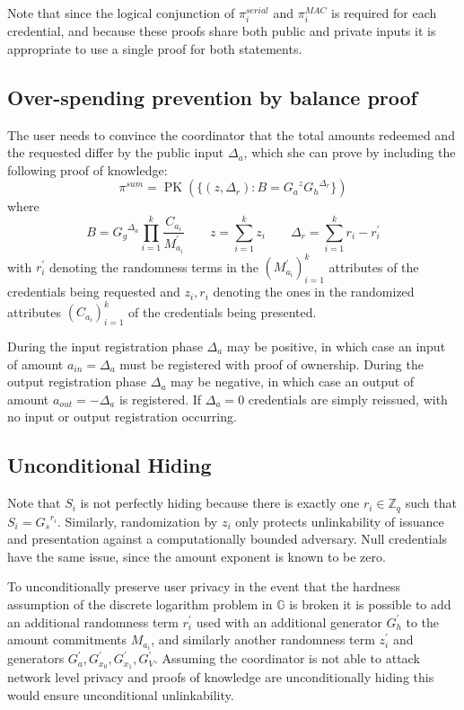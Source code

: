 \documentclass[a4paper]{article}
\begin{document}
Note that since the logical conjunction of $\pi_i^{\mathit{serial}}$ and $\pi_i^{\mathit{MAC}}$ is required for each credential, and because these proofs share both public and private inputs it is appropriate to use a single proof for both statements.

\subsection{Over-spending prevention by balance proof}\label{balance}

The user needs to convince the coordinator that the total amounts redeemed and the requested differ by the public input $\Delta_{a}$, which she can prove by including the following proof of knowledge:
\[ \pi^{\mathit{sum}} = \operatorname{PK}(\{ (z, \Delta_r) : B = {G_a}^{z} {G_h}^{\Delta_r} \})
\]
where
\[
B = {G_g}^{\Delta_a} \prod_{i=1}^k \frac{C_{a_i}}{M^{\prime}_{a_i}}
\qquad
z = \sum_{i=1}^k z_i
\qquad
\Delta_r = \sum_{i=1}^k r_i - r^{\prime}_i
\]
with $r^{\prime}_i$ denoting the randomness terms in the $(M^{\prime}_{a_i})_{i=1}^k$ attributes of the credentials being requested and $z_i, r_i$ denoting the ones in the randomized attributes $(C_{a_i})_{i=1}^k$ of the credentials being presented.

During the input registration phase $\Delta_{a}$ may be positive, in which case an input of amount $a_{\mathit{in}} = \Delta_{a}$ must be registered with proof of ownership. During the output registration phase $\Delta_{a}$ may be negative, in which case an output of amount $a_{\mathit{out}} = -\Delta_{a}$ is registered. If $\Delta_{a} = 0$ credentials are simply reissued, with no input or output registration occurring.

\subsection{Unconditional Hiding}

Note that $S_i$ is not perfectly hiding because there is exactly one $r_i \in \mathbb{Z}_q$ such that $S_i = {G_s}^{r_i}$. Similarly, randomization by $z_i$ only protects unlinkability of issuance and presentation against a computationally bounded adversary. Null credentials have the same issue, since the amount exponent is known to be zero.

To unconditionally preserve user privacy in the event that the hardness assumption of the discrete logarithm problem in $\mathbb{G}$ is broken it is possible to add an additional randomness term $r_i^{\prime}$ used with an additional generator $G_h^{\prime}$ to the amount commitments $M_{a_i}$, and similarly another randomness term $z_i^{\prime}$ and generators $G_a^{\prime}, G_{x_0}^{\prime}, G_{x_1}^{\prime}, G_V^{\prime}$. Assuming the coordinator is not able to attack network level privacy and proofs of knowledge are unconditionally hiding this would ensure unconditional unlinkability.
\end{document}
